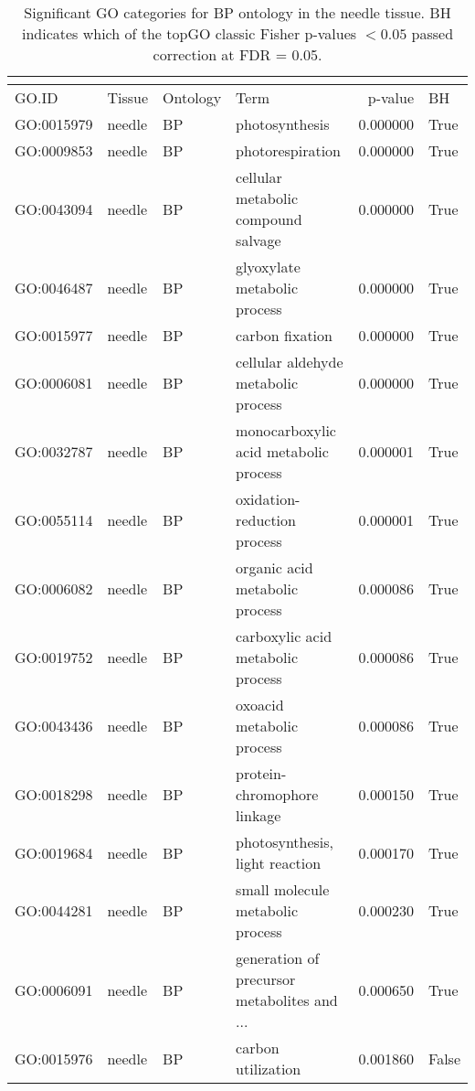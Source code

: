 \begin{longtable}{llllrl}
\caption{Significant GO categories for BP ontology in the needle tissue. BH indicates which of the topGO classic Fisher p-values $< 0.05$ passed correction at FDR = 0.05.}\\
\label{tab:go-needle-BP}\\
\toprule
GO.ID & Tissue & Ontology & Term & p-value & BH \\
\midrule
GO:0015979 & needle & BP &                                photosynthesis  & 0.000000 &    True \\
GO:0009853 & needle & BP &                              photorespiration  & 0.000000 &    True \\
GO:0043094 & needle & BP &           cellular metabolic compound salvage  & 0.000000 &    True \\
GO:0046487 & needle & BP &                  glyoxylate metabolic process  & 0.000000 &    True \\
GO:0015977 & needle & BP &                               carbon fixation  & 0.000000 &    True \\
GO:0006081 & needle & BP &           cellular aldehyde metabolic process  & 0.000000 &    True \\
GO:0032787 & needle & BP &         monocarboxylic acid metabolic process  & 0.000001 &    True \\
GO:0055114 & needle & BP &                   oxidation-reduction process  & 0.000001 &    True \\
GO:0006082 & needle & BP &                organic acid metabolic process  & 0.000086 &    True \\
GO:0019752 & needle & BP &             carboxylic acid metabolic process  & 0.000086 &    True \\
GO:0043436 & needle & BP &                     oxoacid metabolic process  & 0.000086 &    True \\
GO:0018298 & needle & BP &                   protein-chromophore linkage  & 0.000150 &    True \\
GO:0019684 & needle & BP &                photosynthesis, light reaction  & 0.000170 &    True \\
GO:0044281 & needle & BP &              small molecule metabolic process  & 0.000230 &    True \\
GO:0006091 & needle & BP &   generation of precursor metabolites and ...  & 0.000650 &    True \\
GO:0015976 & needle & BP &                            carbon utilization  & 0.001860 &   False \\

\end{longtable}
